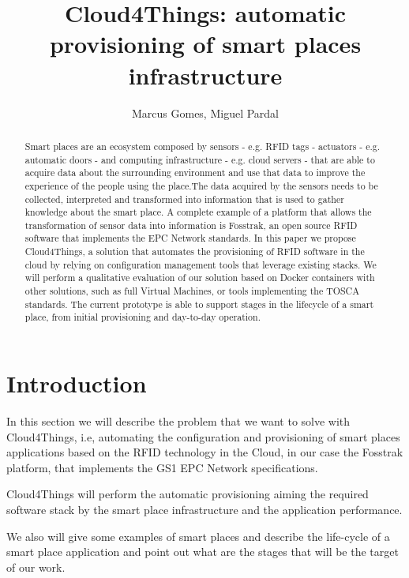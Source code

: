 \documentclass{../llncs2e/llncs}
\title{Cloud4Things: automatic provisioning of smart places infrastructure}
\author{\Large Marcus Gomes, Miguel Pardal}
\institute{\large T\'ecnico Lisboa, Universidade T\'ecnica de Lisboa\\
 \email{\{marcus.paulino.gomes, miguel.pardal\}@tecnico.ulisboa.pt}}
\begin{document}
\maketitle
\begin{abstract}
Smart places are an ecosystem composed by sensors - e.g. RFID tags - actuators - e.g. automatic doors -
and computing infrastructure - e.g. cloud servers - that are able to acquire data about the surrounding
environment and use that data to improve the experience of the people using the place.The data acquired
by the sensors needs to be collected, interpreted and transformed into information that is used to gather
knowledge about the smart place. A complete example of a platform that allows the transformation of sensor
data into information is Fosstrak, an open source RFID software that implements the EPC Network standards.
In this paper we propose Cloud4Things, a solution that automates the provisioning of RFID software in the
cloud by relying on configuration management tools that leverage existing stacks. We will perform a qualitative
evaluation of our solution based on Docker containers with other solutions, such as full Virtual Machines,
or tools implementing the TOSCA standards. The current prototype is able to support stages in the lifecycle of
a smart place, from initial provisioning and day-to-day operation.
\end{abstract}
\section{Introduction}
\label{sec:introduction}
In this section we will describe the problem that we want to solve with Cloud4Things, i.e, automating
the configuration and provisioning of smart places applications based on the RFID technology in the
Cloud, in our case the Fosstrak platform, that implements the GS1 EPC Network specifications.

Cloud4Things will perform the automatic provisioning aiming the required software stack by the smart
place infrastructure and the application performance.

We also will give some examples of smart places and describe the life-cycle of a smart place
application and point out what are the stages that will be the target of our work.
\end{document}

